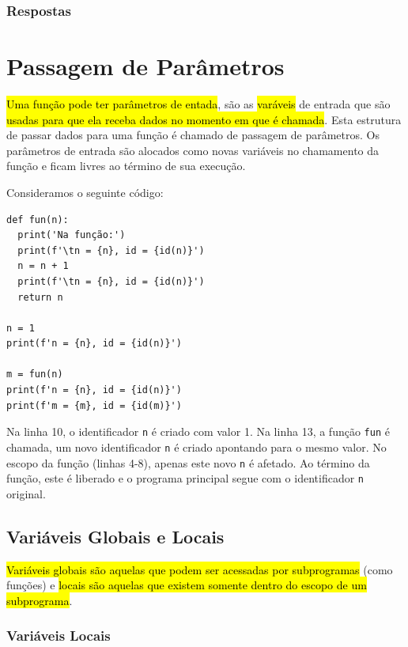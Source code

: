 \ifisbook
\subsubsection{Respostas}
\shipoutAnswer
\fi


\section{Passagem de Parâmetros}\label{cap_fun_sec_params}

\hl{Uma função pode ter parâmetros de entada}, são as \hl{varáveis} de entrada que são \hl{usadas para que ela receba dados no momento em que é chamada}. Esta estrutura de passar dados para uma função é chamado de passagem de parâmetros. Os parâmetros de entrada são alocados como novas variáveis no chamamento da função e ficam livres ao término de sua execução.

\begin{ex}
  Consideramos o seguinte código:

\begin{lstlisting}
def fun(n):
  print('Na função:')
  print(f'\tn = {n}, id = {id(n)}')
  n = n + 1
  print(f'\tn = {n}, id = {id(n)}')
  return n

n = 1
print(f'n = {n}, id = {id(n)}')

m = fun(n)
print(f'n = {n}, id = {id(n)}')
print(f'm = {m}, id = {id(m)}')
\end{lstlisting}
  
Na linha 10, o identificador \lstinline+n+ é criado com valor 1. Na linha 13, a função \lstinline+fun+ é chamada, um novo identificador \lstinline+n+ é criado apontando para o mesmo valor. No escopo da função (linhas 4-8), apenas este novo \lstinline+n+ é afetado. Ao término da função, este é liberado e o programa principal segue com o identificador \lstinline+n+ original.
\end{ex}

\subsection{Variáveis Globais e Locais}

\hl{Variáveis globais são aquelas que podem ser acessadas por subprogramas} (como funções) e \hl{locais são aquelas que existem somente dentro do escopo de um subprograma}.

\subsubsection{Variáveis Locais}


